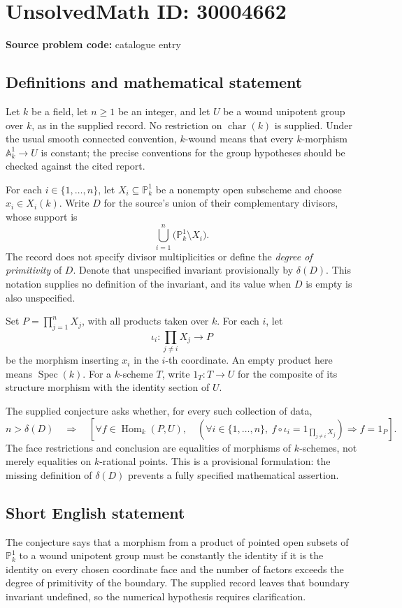 \documentclass[11pt]{article}
\begin{document}
\section*{UnsolvedMath ID: 30004662}
\textbf{Source problem code:} catalogue entry
\subsection{Definitions and mathematical statement}
Let \(k\) be a field, let \(n\geq 1\) be an integer, and let \(U\) be a wound unipotent group over \(k\), as in the supplied record. No restriction on \(\operatorname{char}(k)\) is supplied. Under the usual smooth connected convention, \(k\)-wound means that every \(k\)-morphism \(\mathbb A^1_k\to U\) is constant; the precise conventions for the group hypotheses should be checked against the cited report.

For each \(i\in\{1,\ldots,n\}\), let \(X_i\subseteq\mathbb P^1_k\) be a nonempty open subscheme and choose \(x_i\in X_i(k)\). Write \(D\) for the source's union of their complementary divisors, whose support is
\[
\bigcup_{i=1}^{n}\bigl(\mathbb P^1_k\setminus X_i\bigr).
\]
The record does not specify divisor multiplicities or define the \emph{degree of primitivity} of \(D\). Denote that unspecified invariant provisionally by \(\delta(D)\). This notation supplies no definition of the invariant, and its value when \(D\) is empty is also unspecified.

Set \(P=\prod_{j=1}^{n}X_j\), with all products taken over \(k\). For each \(i\), let
\[
\iota_i:\prod_{j\ne i}X_j\longrightarrow P
\]
be the morphism inserting \(x_i\) in the \(i\)-th coordinate. An empty product here means \(\operatorname{Spec}(k)\). For a \(k\)-scheme \(T\), write \(1_T:T\to U\) for the composite of its structure morphism with the identity section of \(U\).

The supplied conjecture asks whether, for every such collection of data,
\[
 n>\delta(D)
 \quad\Longrightarrow\quad
 \left[
 \forall f\in\operatorname{Hom}_k(P,U),\quad
 \left(\forall i\in\{1,\ldots,n\},\ f\circ\iota_i=1_{\prod_{j\ne i}X_j}\right)
 \Longrightarrow f=1_P
 \right].
\]
The face restrictions and conclusion are equalities of morphisms of \(k\)-schemes, not merely equalities on \(k\)-rational points. This is a provisional formulation: the missing definition of \(\delta(D)\) prevents a fully specified mathematical assertion.
\subsection{Short English statement}
The conjecture says that a morphism from a product of pointed open subsets of \(\mathbb P^1_k\) to a wound unipotent group must be constantly the identity if it is the identity on every chosen coordinate face and the number of factors exceeds the degree of primitivity of the boundary. The supplied record leaves that boundary invariant undefined, so the numerical hypothesis requires clarification.
\end{document}
